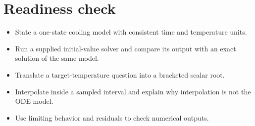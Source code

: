 \documentclass[11pt,letterpaper]{article}
\theoremstyle{definition}\newtheorem{definition}{Definition}\newtheorem{example}{Example}
\numberwithin{equation}{section}
\begin{document}
\section*{Readiness check}
\begin{itemize}
\item State a one-state cooling model with consistent time and temperature units.
\item Run a supplied initial-value solver and compare its output with an exact solution of the same model.
\item Translate a target-temperature question into a bracketed scalar root.
\item Interpolate inside a sampled interval and explain why interpolation is not the ODE model.
\item Use limiting behavior and residuals to check numerical outputs.
\end{itemize}
\end{document}
